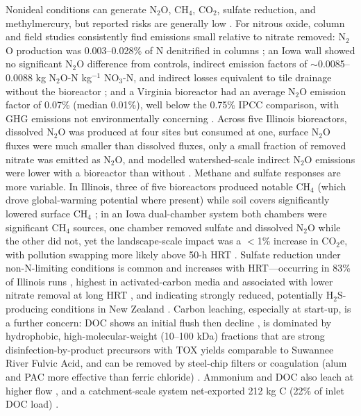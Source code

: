 Nonideal conditions can generate N$_2$O, CH$_4$, CO$_2$, sulfate reduction, and methylmercury, but reported risks are generally low \parencite{Hartfiel2022}. For nitrous oxide, column and field studies consistently find emissions small relative to nitrate removed: N$_2$O production was 0.003--0.028\% of N denitrified in columns \parencite{Greenan2009}; an Iowa wall showed no significant N$_2$O difference from controls, indirect emission factors of $\sim$0.0085--0.0088 kg N$_2$O-N kg$^{-1}$ NO$_3$-N, and indirect losses equivalent to tile drainage without the bioreactor \parencite{Moorman2010}; and a Virginia bioreactor had an average N$_2$O emission factor of 0.07\% (median 0.01\%), well below the 0.75\% IPCC comparison, with GHG emissions not environmentally concerning \parencite{Bock2018}. Across five Illinois bioreactors, dissolved N$_2$O was produced at four sites but consumed at one, surface N$_2$O fluxes were much smaller than dissolved fluxes, only a small fraction of removed nitrate was emitted as N$_2$O, and modelled watershed-scale indirect N$_2$O emissions were lower with a bioreactor than without \parencite{Brunton2024}. Methane and sulfate responses are more variable. In Illinois, three of five bioreactors produced notable CH$_4$ (which drove global-warming potential where present) while soil covers significantly lowered surface CH$_4$ \parencite{Brunton2024}; in an Iowa dual-chamber system both chambers were significant CH$_4$ sources, one chamber removed sulfate and dissolved N$_2$O while the other did not, yet the landscape-scale impact was a $<$1\% increase in CO$_2$e, with pollution swapping more likely above 50-h HRT \parencite{Hartfiel2023b}. Sulfate reduction under non-N-limiting conditions is common and increases with HRT---occurring in 83\% of Illinois runs \parencite{Bell2015}, highest in activated-carbon media and associated with lower nitrate removal at long HRT \parencite{Povilaitis2020}, and indicating strongly reduced, potentially H$_2$S-producing conditions in New Zealand \parencite{Rivas2020}. Carbon leaching, especially at start-up, is a further concern: DOC shows an initial flush then decline \parencite{Abusallout2017,Rivas2020}, is dominated by hydrophobic, high-molecular-weight (10--100 kDa) fractions that are strong disinfection-by-product precursors with TOX yields comparable to Suwannee River Fulvic Acid, and can be removed by steel-chip filters or coagulation (alum and PAC more effective than ferric chloride) \parencite{Abusallout2017}. Ammonium and DOC also leach at higher flow \parencite{Greenan2009}, and a catchment-scale system net-exported 212 kg C (22\% of inlet DOC load) \parencite{Feyereisen2023}.

